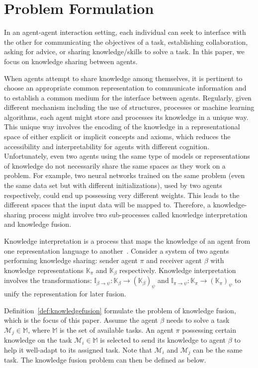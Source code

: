 \documentclass[lettersize,journal]{IEEEtran}
\begin{document}
\section{Problem Formulation}\label{jpaper2-problemdefinition}

In an agent-agent interaction setting, each individual can seek to interface with the other for communicating the objectives of a task, establishing collaboration, asking for advice, or sharing knowledge/skills to solve a task. In this paper, we focus on knowledge sharing between agents.

When agents attempt to share knowledge among themselves, it is pertinent to choose an appropriate common representation to communicate information and to establish a common medium for the interface between agents. Regularly, given different mechanism including the use of structures, processes or machine learning algorithms, each agent might store and processes its knowledge in a unique way. This unique way involves the encoding of the knowledge in a representational space of either explicit or implicit concepts and axioms, which reduces the accessibility and interpretability for agents with different cognition. Unfortunately, even two agents using the same type of models or representations of knowledge do not necessarily share the same spaces as they work on a problem. For example, two neural networks trained on the same problem (even the same data set but with different initializations), used by two agents respectively, could end up possessing very different weights. This leads to the different spaces that the input data will be mapped to. Therefore, a knowledge-sharing process might involve two sub-processes called knowledge interpretation and knowledge fusion. 

Knowledge interpretation is a process that maps the knowledge of an agent from one representation language to another~\cite{abbass2021symbiomemesis}. Consider a system of two agents performing knowledge sharing: sender agent $\pi$ and receiver agent $\beta$ with knowledge representations $\mathbb{K}_\pi$ and $\mathbb{K}_\beta$ respectively. Knowledge interpretation involves the transformations: $\mathbb{I}_{\beta\to\psi}: \mathbb{K}_\beta \to (\mathbb{K}_\beta)_\psi$ and $\mathbb{I}_{\pi\to\psi}: \mathbb{K}_\pi \to (\mathbb{K}_\pi)_\psi$ to unify the representation for later fusion.


Definition~\ref{def:knowledgefusion} formulate the problem of knowledge fusion, which is the focus of this paper. Assume the agent $\beta$ needs to solve a task $\mathcal{M}_j \in \mathbb{M}$, where $\mathbb{M}$ is the set of available tasks. An agent $\pi$ possessing certain knowledge on the task $\mathcal{M}_i \in \mathbb{M}$ is selected to send its knowledge to agent $\beta$ to help it well-adapt to its assigned task. Note that $\mathcal{M}_i$ and $\mathcal{M}_j$ can be the same task. The knowledge fusion problem can then be defined as below.
\end{document}
